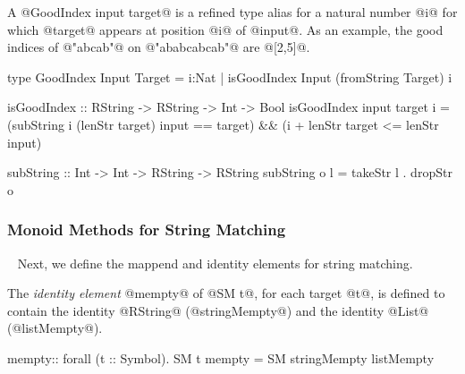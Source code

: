 A @GoodIndex input target@ is a refined type alias for a natural
number @i@ for which @target@ appears at position @i@ of @input@.  As
an example, the good indices of @"abcab"@ on @"ababcabcab"@ are
@[2,5]@.
%
\begin{code}
type GoodIndex Input Target
  = {i:Nat | isGoodIndex Input (fromString Target) i }

isGoodIndex :: RString -> RString -> Int -> Bool
isGoodIndex input target i
  = (subString i (lenStr target) input  == target)
  && (i + lenStr target <= lenStr input)

subString :: Int -> Int -> RString -> RString
subString o l = takeStr l . dropStr o
\end{code}
%

\subsubsection{Monoid Methods for String Matching}~\label{subsec:monoid:methods}
Next, we define the mappend and identity elements for string matching.

The \textit{identity element} @mempty@ of @SM t@, for each target @t@, is
defined to contain the identity @RString@ (@stringMempty@) and the
identity @List@ (@listMempty@).
\begin{code}
mempty:: forall (t :: Symbol). SM t
mempty = SM stringMempty listMempty
\end{code}
%

